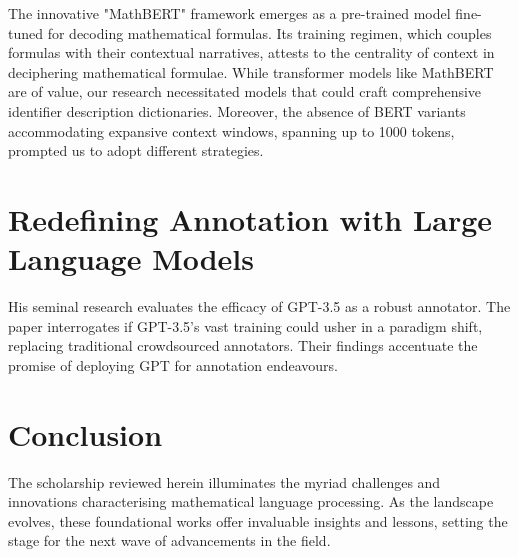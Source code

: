 The innovative "MathBERT" framework \parencite{peng2021mathbert} emerges as a pre-trained model fine-tuned for decoding mathematical formulas. Its training regimen, which couples formulas with their contextual narratives, attests to the centrality of context in deciphering mathematical formulae. While transformer models like MathBERT are of value, our research necessitated models that could craft comprehensive identifier description dictionaries. Moreover, the absence of BERT variants accommodating expansive context windows, spanning up to 1000 tokens, prompted us to adopt different strategies.

\section{Redefining Annotation with Large Language Models}

His seminal research \parencite{he2023annollm} evaluates the efficacy of GPT-3.5 as a robust annotator. The paper interrogates if GPT-3.5's vast training could usher in a paradigm shift, replacing traditional crowdsourced annotators. Their findings accentuate the promise of deploying GPT for annotation endeavours.

\section{Conclusion}

The scholarship reviewed herein illuminates the myriad challenges and innovations characterising mathematical language processing. As the landscape evolves, these foundational works offer invaluable insights and lessons, setting the stage for the next wave of advancements in the field.